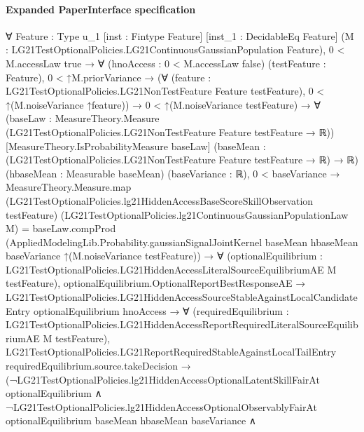 \documentclass[10pt]{article}
\begin{document}
\paragraph{Expanded PaperInterface specification}
\begin{ReviewVerbatim}
∀ {Feature : Type u_1} [inst : Fintype Feature] [inst_1 : DecidableEq Feature]
  (M : LG21TestOptionalPolicies.LG21ContinuousGaussianPopulation Feature),
  0 < M.accessLaw {true} →
    ∀ (hnoAccess : 0 < M.accessLaw {false}) (testFeature : Feature),
      0 < ↑M.priorVariance →
        (∀ (feature : LG21TestOptionalPolicies.LG21NonTestFeature Feature testFeature),
            0 < ↑(M.noiseVariance ↑feature)) →
          0 < ↑(M.noiseVariance testFeature) →
            ∀ (baseLaw : MeasureTheory.Measure (LG21TestOptionalPolicies.LG21NonTestFeature Feature testFeature → ℝ))
              [MeasureTheory.IsProbabilityMeasure baseLaw]
              (baseMean : (LG21TestOptionalPolicies.LG21NonTestFeature Feature testFeature → ℝ) → ℝ)
              (hbaseMean : Measurable baseMean) (baseVariance : ℝ),
              0 < baseVariance →
                MeasureTheory.Measure.map
                      (LG21TestOptionalPolicies.lg21HiddenAccessBaseScoreSkillObservation testFeature)
                      (LG21TestOptionalPolicies.lg21ContinuousGaussianPopulationLaw M) =
                    baseLaw.compProd
                      (AppliedModelingLib.Probability.gaussianSignalJointKernel baseMean hbaseMean baseVariance
                        ↑(M.noiseVariance testFeature)) →
                  ∀
                    (optionalEquilibrium :
                      LG21TestOptionalPolicies.LG21HiddenAccessLiteralSourceEquilibriumAE M testFeature),
                    optionalEquilibrium.OptionalReportBestResponseAE →
                      LG21TestOptionalPolicies.LG21HiddenAccessSourceStableAgainstLocalCandidateEntry
                          optionalEquilibrium hnoAccess →
                        ∀
                          (requiredEquilibrium :
                            LG21TestOptionalPolicies.LG21HiddenAccessReportRequiredLiteralSourceEquilibriumAE M
                              testFeature),
                          LG21TestOptionalPolicies.LG21ReportRequiredStableAgainstLocalTailEntry
                              requiredEquilibrium.source.takeDecision →
                            (¬LG21TestOptionalPolicies.lg21HiddenAccessOptionalLatentSkillFairAt optionalEquilibrium ∧
                                ¬LG21TestOptionalPolicies.lg21HiddenAccessOptionalObservablyFairAt optionalEquilibrium
                                      baseMean hbaseMean baseVariance ∧

\end{ReviewVerbatim}
\end{document}
